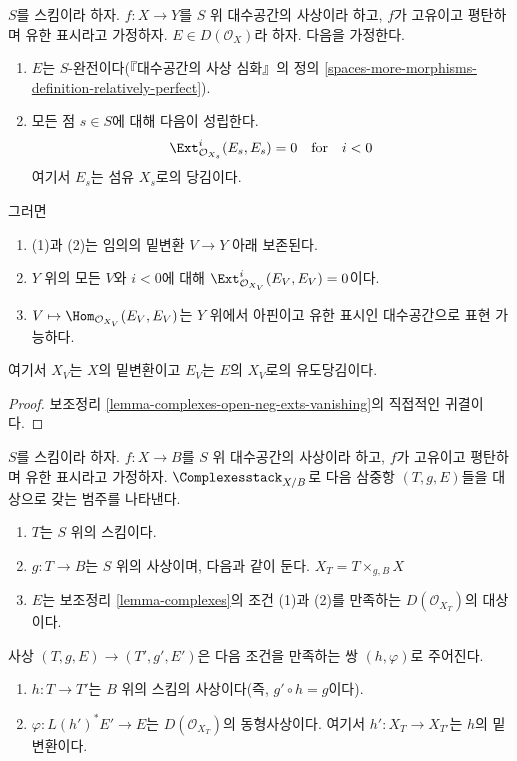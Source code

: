 \begin{lemma}
\label{lemma-complexes}
$S$를 스킴이라 하자. $f : X \to Y$를 $S$ 위 대수공간의 사상이라 하고,
$f$가 고유이고 평탄하며 유한 표시라고 가정하자.
$E \in D(\mathcal{O}_X)$라 하자. 다음을 가정한다.
\begin{enumerate}
\item $E$는 $S$-완전이다(『대수공간의 사상 심화』의 정의
\ref{spaces-more-morphisms-definition-relatively-perfect}).
\item 모든 점 $s \in S$에 대해 다음이 성립한다.
$$
\Ext^i_{\mathcal{O}_{X_s}}(E_s, E_s) = 0
\quad\text{for}\quad i < 0
$$
여기서 $E_s$는 섬유 $X_s$로의 당김이다.
\end{enumerate}
그러면
\begin{enumerate}
\item[(a)] (1)과 (2)는 임의의 밑변환 $V \to Y$ 아래 보존된다.
\item[(b)] $Y$ 위의 모든 $V$와 $i < 0$에 대해
$\Ext^i_{\mathcal{O}_{X_V}}(E_V, E_V) = 0$이다.
\item[(c)] $V \mapsto \Hom_{\mathcal{O}_{X_V}}(E_V, E_V)$는 $Y$ 위에서
아핀이고 유한 표시인 대수공간으로 표현 가능하다.
\end{enumerate}
여기서 $X_V$는 $X$의 밑변환이고 $E_V$는 $E$의 $X_V$로의 유도당김이다.
\end{lemma}

\begin{proof}
보조정리 \ref{lemma-complexes-open-neg-exts-vanishing}의 직접적인 귀결이다.
\end{proof}

\begin{situation}
\label{situation-complexes}
$S$를 스킴이라 하자. $f : X \to B$를 $S$ 위 대수공간의 사상이라 하고,
$f$가 고유이고 평탄하며 유한 표시라고 가정하자.
$\Complexesstack_{X/B}$로 다음 삼중항 $(T, g, E)$들을 대상으로 갖는 범주를
나타낸다.
\begin{enumerate}
\item $T$는 $S$ 위의 스킴이다.
\item $g : T \to B$는 $S$ 위의 사상이며, 다음과 같이 둔다.
$X_T = T \times_{g, B} X$
\item $E$는 보조정리 \ref{lemma-complexes}의 조건 (1)과 (2)를 만족하는
$D(\mathcal{O}_{X_T})$의 대상이다.
\end{enumerate}
사상 $(T, g, E) \to (T', g', E')$은 다음 조건을 만족하는 쌍
$(h, \varphi)$로 주어진다.
\begin{enumerate}
\item $h : T \to T'$는 $B$ 위의 스킴의 사상이다(즉, $g' \circ h = g$이다).
\item $\varphi : L(h')^*E' \to E$는 $D(\mathcal{O}_{X_T})$의 동형사상이다.
여기서 $h' : X_T \to X_{T'}$는 $h$의 밑변환이다.
\end{enumerate}
\end{situation}

